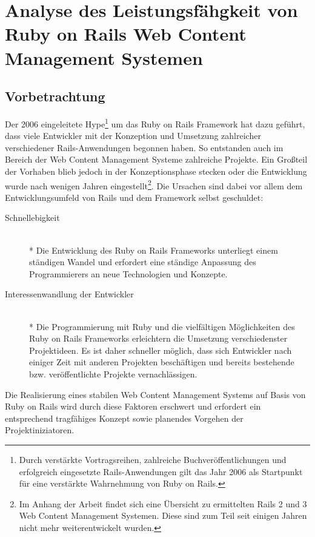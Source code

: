 \chapter{Analyse des Leistungsfähgkeit von Ruby on Rails Web Content Management Systemen}


\section{Vorbetrachtung}
Der 2006 eingeleitete Hype\footnote{Durch verstärkte Vortragsreihen, zahlreiche Buchveröffentlichungen und erfolgreich eingesetzte Rails-Anwendungen gilt das Jahr 2006 als Startpunkt für eine verstärkte Wahrnehmung von Ruby on Rails.} um das Ruby on Rails Framework hat dazu geführt, dass viele Entwickler mit der Konzeption und Umsetzung zahlreicher verschiedener Rails-Anwendungen begonnen haben. So entstanden auch im Bereich der Web Content Management Systeme zahlreiche Projekte. Ein Großteil der Vorhaben blieb jedoch in der Konzeptionsphase stecken oder die Entwicklung wurde nach wenigen Jahren eingestellt\footnote{Im Anhang der Arbeit findet sich eine Übersicht zu ermittelten Rails 2 und 3 Web Content Management Systemen. Diese sind zum Teil seit einigen Jahren nicht mehr weiterentwickelt wurden.}. Die Ursachen sind dabei vor allem dem Entwicklungsumfeld von Rails und dem Framework selbst geschuldet:


\begin{description}
\item[Schnellebigkeit]\mbox{~}\\*
Die Entwicklung des Ruby on Rails Frameworks unterliegt einem ständigen Wandel und erfordert eine ständige Anpassung des Programmierers an neue Technologien und Konzepte.
\item[Interessenwandlung der Entwickler]\mbox{~}\\*
Die Programmierung mit Ruby und die vielfältigen Möglichkeiten des Ruby on Rails Frameworks erleichtern die Umsetzung verschiedenster Projektideen.
Es ist daher schneller möglich, dass sich Entwickler nach einiger Zeit mit anderen Projekten beschäftigen und bereits bestehende bzw. veröffentlichte Projekte vernachlässigen.
\end{description}

Die Realisierung eines stabilen Web Content Management Systems auf Basis von Ruby on Rails wird durch diese Faktoren erschwert und erfordert ein entsprechend tragfähiges Konzept sowie planendes Vorgehen der Projektiniziatoren.

